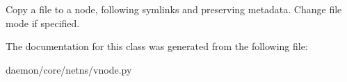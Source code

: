 \begin{DoxyVerb}Copy a file to a node, following symlinks and preserving metadata.
Change file mode if specified.
\end{DoxyVerb}
 

The documentation for this class was generated from the following file\+:\begin{DoxyCompactItemize}
\item 
daemon/core/netns/vnode.\+py\end{DoxyCompactItemize}
